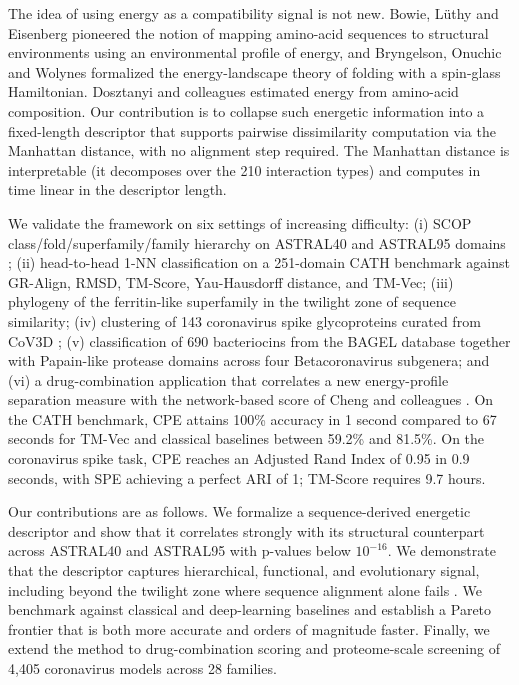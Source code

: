 The idea of using energy as a compatibility signal is not new. Bowie, L\"uthy and Eisenberg \citep{bowie1991eisenberg} pioneered the notion of mapping amino-acid sequences to structural environments using an environmental profile of energy, and Bryngelson, Onuchic and Wolynes \citep{bryngelson1995wolynes} formalized the energy-landscape theory of folding with a spin-glass Hamiltonian. Dosztanyi and colleagues \citep{dosztanyi2008energy} estimated energy from amino-acid composition. Our contribution is to collapse such energetic information into a fixed-length descriptor that supports pairwise dissimilarity computation via the Manhattan distance, with no alignment step required. The Manhattan distance is interpretable (it decomposes over the 210 interaction types) and computes in time linear in the descriptor length.

We validate the framework on six settings of increasing difficulty: (i) SCOP class/fold/superfamily/family hierarchy on ASTRAL40 and ASTRAL95 domains \citep{chandonia2019scope}; (ii) head-to-head 1-NN classification on a 251-domain CATH benchmark against GR-Align, RMSD, TM-Score, Yau-Hausdorff distance, and TM-Vec; (iii) phylogeny of the ferritin-like superfamily \citep{lundin2012ferritin} in the twilight zone of sequence similarity; (iv) clustering of 143 coronavirus spike glycoproteins curated from CoV3D \citep{gowthaman2021cov3d}; (v) classification of 690 bacteriocins from the BAGEL database \citep{alkhalili2018bagel} together with Papain-like protease domains across four Betacoronavirus subgenera; and (vi) a drug-combination application that correlates a new energy-profile separation measure with the network-based score of Cheng and colleagues \citep{zhou2020network}. On the CATH benchmark, CPE attains 100\% accuracy in 1 second compared to 67 seconds for TM-Vec and classical baselines between 59.2\% and 81.5\%. On the coronavirus spike task, CPE reaches an Adjusted Rand Index of 0.95 in 0.9 seconds, with SPE achieving a perfect ARI of 1; TM-Score requires 9.7 hours.

Our contributions are as follows. We formalize a sequence-derived energetic descriptor and show that it correlates strongly with its structural counterpart across ASTRAL40 and ASTRAL95 with p-values below $10^{-16}$. We demonstrate that the descriptor captures hierarchical, functional, and evolutionary signal, including beyond the twilight zone where sequence alignment alone fails \citep{chothia1986twilight}. We benchmark against classical and deep-learning baselines and establish a Pareto frontier that is both more accurate and orders of magnitude faster. Finally, we extend the method to drug-combination scoring and proteome-scale screening of 4,405 coronavirus models across 28 families.

